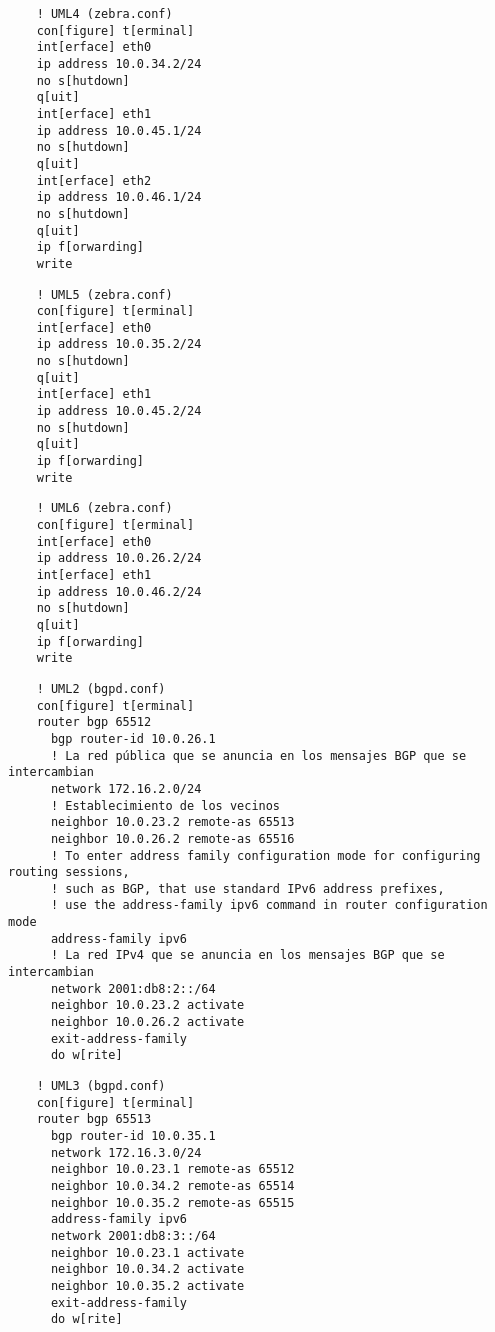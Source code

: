   \begin{verbatim}
    ! UML4 (zebra.conf)
    con[figure] t[erminal]
    int[erface] eth0
    ip address 10.0.34.2/24
    no s[hutdown]
    q[uit]
    int[erface] eth1
    ip address 10.0.45.1/24
    no s[hutdown]
    q[uit]
    int[erface] eth2
    ip address 10.0.46.1/24
    no s[hutdown]
    q[uit]
    ip f[orwarding]
    write
  \end{verbatim}
  
  \begin{verbatim}
    ! UML5 (zebra.conf)
    con[figure] t[erminal]
    int[erface] eth0
    ip address 10.0.35.2/24
    no s[hutdown]
    q[uit]
    int[erface] eth1
    ip address 10.0.45.2/24
    no s[hutdown]
    q[uit]
    ip f[orwarding]
    write
  \end{verbatim}
  
  \begin{verbatim}
    ! UML6 (zebra.conf)
    con[figure] t[erminal]
    int[erface] eth0
    ip address 10.0.26.2/24
    int[erface] eth1
    ip address 10.0.46.2/24
    no s[hutdown]
    q[uit]
    ip f[orwarding]
    write
  \end{verbatim}
  
  \begin{verbatim}
    ! UML2 (bgpd.conf)
    con[figure] t[erminal]
    router bgp 65512
      bgp router-id 10.0.26.1
      ! La red pública que se anuncia en los mensajes BGP que se intercambian
      network 172.16.2.0/24
      ! Establecimiento de los vecinos
      neighbor 10.0.23.2 remote-as 65513
      neighbor 10.0.26.2 remote-as 65516
      ! To enter address family configuration mode for configuring routing sessions,
      ! such as BGP, that use standard IPv6 address prefixes, 
      ! use the address-family ipv6 command in router configuration mode
      address-family ipv6
      ! La red IPv4 que se anuncia en los mensajes BGP que se intercambian
      network 2001:db8:2::/64
      neighbor 10.0.23.2 activate
      neighbor 10.0.26.2 activate
      exit-address-family
      do w[rite]
  \end{verbatim}
  
  \begin{verbatim}
    ! UML3 (bgpd.conf)
    con[figure] t[erminal]
    router bgp 65513
      bgp router-id 10.0.35.1
      network 172.16.3.0/24
      neighbor 10.0.23.1 remote-as 65512
      neighbor 10.0.34.2 remote-as 65514
      neighbor 10.0.35.2 remote-as 65515
      address-family ipv6
      network 2001:db8:3::/64
      neighbor 10.0.23.1 activate
      neighbor 10.0.34.2 activate
      neighbor 10.0.35.2 activate
      exit-address-family
      do w[rite]
  \end{verbatim}
  
